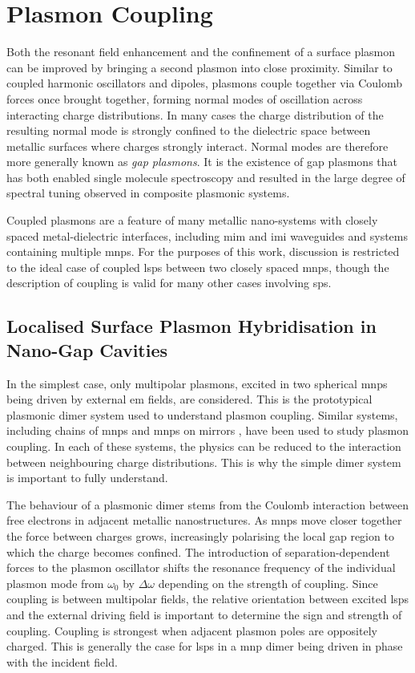 \documentclass{article}
\begin{document}
\section{Plasmon Coupling}

Both the resonant field enhancement and the confinement of a surface plasmon can be improved by bringing a second plasmon into close proximity. Similar to coupled harmonic oscillators and dipoles, plasmons couple together via Coulomb forces once brought together, forming normal modes of oscillation across interacting charge distributions. In many cases the charge distribution of the resulting normal mode is strongly confined to the dielectric space between metallic surfaces where charges strongly interact. Normal modes are therefore more generally known as \emph{gap plasmons}. It is the existence of gap plasmons that has both enabled single molecule spectroscopy and resulted in the large degree of spectral tuning observed in composite plasmonic systems.

Coupled plasmons are a feature of many metallic nano-systems with closely spaced metal-dielectric interfaces, including \gls{mim} and \gls{imi} waveguides and systems containing multiple \glspl{mnp}. For the purposes of this work, discussion is restricted to the ideal case of coupled \glspl{lsp} between two closely spaced \glspl{mnp}, though the description of coupling is valid for many other cases involving \glspl{sp}.

\subsection{Localised Surface Plasmon Hybridisation in Nano-Gap Cavities}

In the simplest case, only multipolar plasmons, excited in two spherical \glspl{mnp} being driven by external \gls{em} fields, are considered. This is the prototypical plasmonic dimer system used to understand plasmon coupling. Similar systems, including chains of \glspl{mnp} \cite{maier2002} and \glspl{mnp} on mirrors \cite{mertens2013, denijs2014}, have been used to study plasmon coupling. In each of these systems, the physics can be reduced to the interaction between neighbouring charge distributions. This is why the simple dimer system is important to fully understand.

The behaviour of a plasmonic dimer stems from the Coulomb interaction between free electrons in adjacent metallic nanostructures. As \glspl{mnp} move closer together the force between charges grows, increasingly polarising the local gap region to which the charge becomes confined. The introduction of separation-dependent forces to the plasmon oscillator shifts the resonance frequency of the individual plasmon mode from $\omega_0$ by $\Delta\omega$ depending on the strength of coupling. Since coupling is between multipolar fields, the relative orientation between excited \glspl{lsp} and the external driving field is important to determine the sign and strength of coupling. Coupling is strongest when adjacent plasmon poles are oppositely charged. This is generally the case for \glspl{lsp} in a \gls{mnp} dimer being driven in phase with the incident field.
\end{document}
